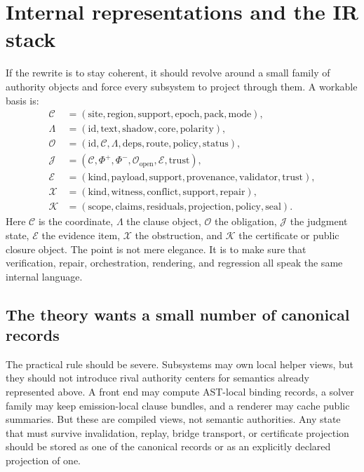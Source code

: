 \documentclass[11pt]{report}
\begin{document}
\chapter{Internal representations and the IR stack}
If the rewrite is to stay coherent, it should revolve around a small family of authority objects and force every subsystem to project through them. A workable basis is:
\[
\begin{aligned}
\mathcal{C} &= (\mathrm{site}, \mathrm{region}, \mathrm{support}, \mathrm{epoch}, \mathrm{pack}, \mathrm{mode}),\\
\Lambda &= (\mathrm{id}, \mathrm{text}, \mathrm{shadow}, \mathrm{core}, \mathrm{polarity}),\\
\mathcal{O} &= (\mathrm{id}, \mathcal{C}, \Lambda, \mathrm{deps}, \mathrm{route}, \mathrm{policy}, \mathrm{status}),\\
\mathcal{J} &= (\mathcal{C}, \Phi^{+}, \Phi^{-}, \mathcal{O}_{\mathrm{open}}, \mathcal{E}, \mathrm{trust}),\\
\mathcal{E} &= (\mathrm{kind}, \mathrm{payload}, \mathrm{support}, \mathrm{provenance}, \mathrm{validator}, \mathrm{trust}),\\
\mathcal{X} &= (\mathrm{kind}, \mathrm{witness}, \mathrm{conflict}, \mathrm{support}, \mathrm{repair}),\\
\mathcal{K} &= (\mathrm{scope}, \mathrm{claims}, \mathrm{residuals}, \mathrm{projection}, \mathrm{policy}, \mathrm{seal}).
\end{aligned}
\]
Here $\mathcal{C}$ is the coordinate, $\Lambda$ the clause object, $\mathcal{O}$ the obligation, $\mathcal{J}$ the judgment state, $\mathcal{E}$ the evidence item, $\mathcal{X}$ the obstruction, and $\mathcal{K}$ the certificate or public closure object. The point is not mere elegance. It is to make sure that verification, repair, orchestration, rendering, and regression all speak the same internal language.
\section{The theory wants a small number of canonical records}
The practical rule should be severe. Subsystems may own local helper views, but they should not introduce rival authority centers for semantics already represented above. A front end may compute AST-local binding records, a solver family may keep emission-local clause bundles, and a renderer may cache public summaries. But these are compiled views, not semantic authorities. Any state that must survive invalidation, replay, bridge transport, or certificate projection should be stored as one of the canonical records or as an explicitly declared projection of one.
\end{document}
